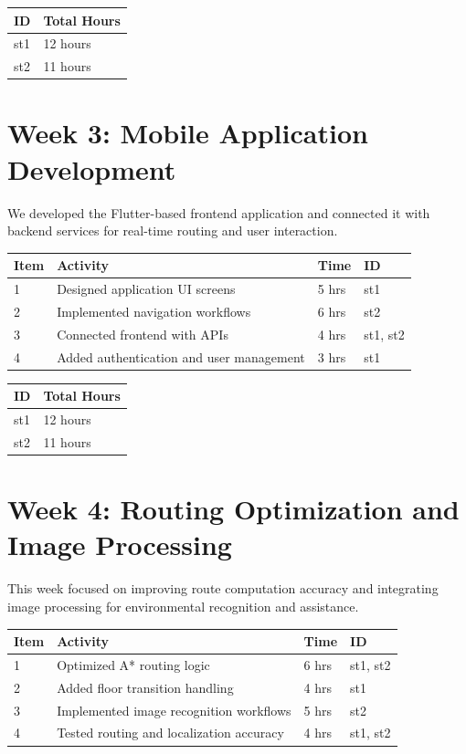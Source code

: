 \documentclass{article}
\begin{document}
\bigskip

\begin{tabular}{|l|l|}
  \hline
  ID & Total Hours \\\hline\hline
  st1 & 12 hours \\\hline
  st2 & 11 hours \\\hline
\end{tabular}

\newpage
\section*{Week 3: Mobile Application Development}

We developed the Flutter-based frontend application and connected it with backend services for real-time routing and user interaction.

\begin{tabular}{|l|l|l|l|}
  \hline
  Item & Activity & Time & ID \\\hline\hline
  1 & Designed application UI screens & 5 hrs & st1 \\\hline
  2 & Implemented navigation workflows & 6 hrs & st2 \\\hline
  3 & Connected frontend with APIs & 4 hrs & st1, st2 \\\hline
  4 & Added authentication and user management & 3 hrs & st1 \\\hline
\end{tabular}

\bigskip

\begin{tabular}{|l|l|}
  \hline
  ID & Total Hours \\\hline\hline
  st1 & 12 hours \\\hline
  st2 & 11 hours \\\hline
\end{tabular}

\newpage
\section*{Week 4: Routing Optimization and Image Processing}

This week focused on improving route computation accuracy and integrating image processing for environmental recognition and assistance.

\begin{tabular}{|l|l|l|l|}
  \hline
  Item & Activity & Time & ID \\\hline\hline
  1 & Optimized A* routing logic & 6 hrs & st1, st2 \\\hline
  2 & Added floor transition handling & 4 hrs & st1 \\\hline
  3 & Implemented image recognition workflows & 5 hrs & st2 \\\hline
  4 & Tested routing and localization accuracy & 4 hrs & st1, st2 \\\hline
\end{tabular}
\end{document}
